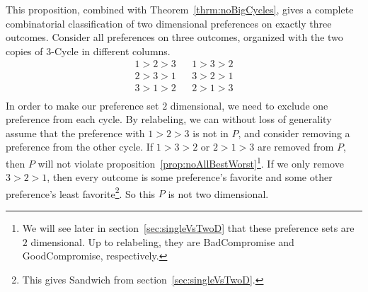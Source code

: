 \documentclass[12pt]{article}
\newtheorem{theorem}{Theorem}
\newcommand{\1}[1]{\mathds{1}[{#1}]}
\begin{document}
    This proposition, combined with Theorem~\ref{thrm:noBigCycles}, gives a
    complete combinatorial classification of two dimensional preferences on
    exactly three outcomes. Consider all preferences on three outcomes,
    organized with the two copies of $3$-{\sc Cycle} in different columns.
    \begin{align*}
      1 > 2 > 3 && 1 > 3 > 2 \\
      2 > 3 > 1 && 3 > 2 > 1 \\
      3 > 1 > 2 && 2 > 1 > 3 \\
    \end{align*}
    In order to make our preference set $2$ dimensional, we need to exclude one
    preference from each cycle.
    By relabeling, we can without loss of generality assume that the
    preference with $1 > 2 > 3$ is not in $P$, and consider removing a
    preference from the other cycle.
    If $1 > 3 > 2$ or $2 > 1 > 3$ are removed from $P$, then $P$ will not
    violate proposition~\ref{prop:noAllBestWorst}\footnote{
      We will see later in section~\ref{sec:singleVsTwoD}
      that these preference sets are $2$ dimensional. Up to relabeling, they are
      {\sc BadCompromise} and {\sc GoodCompromise}, respectively.
    }.
    If we only remove $3 > 2 > 1$, then every outcome is some preference's
    favorite and some other preference's least favorite\footnote{
      This gives {\sc Sandwich} from section~\ref{sec:singleVsTwoD}.
    }.
    So this $P$ is not two dimensional.

\end{document}
